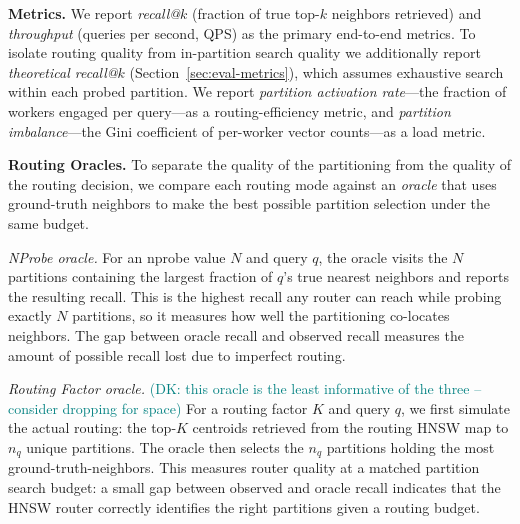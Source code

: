 \documentclass[sigconf,review,anonymous]{acmart}
\newcommand{\dk}[1]{\textcolor{teal}{(DK: #1)}}
\begin{document}
\textbf{Metrics.} We report \emph{recall@$k$} (fraction of true top-$k$ neighbors retrieved) and \emph{throughput} (queries per second, QPS) as the primary end-to-end metrics. To isolate routing quality from in-partition search quality we additionally report \emph{theoretical recall@$k$} (Section~\ref{sec:eval-metrics}), which assumes exhaustive search within each probed partition. We report \emph{partition activation rate}---the fraction of workers engaged per query---as a routing-efficiency metric, and \emph{partition imbalance}---the Gini coefficient of per-worker vector counts---as a load metric. 

\textbf{Routing Oracles.}
\label{sec:routing-oracles}
To separate the quality of the partitioning from the quality of the routing decision, we compare each routing mode against an \emph{oracle} that uses ground-truth neighbors to make the best possible partition selection under the same budget.

\textit{NProbe oracle.} For an nprobe value $N$ and query $q$, the oracle visits the $N$ partitions containing the largest fraction of $q$'s true nearest neighbors and reports the resulting recall. This is the highest recall any router can reach while probing exactly $N$ partitions, so it measures how well the partitioning co-locates neighbors. The gap between oracle recall and observed recall measures the amount of possible recall lost due to imperfect routing.

\textit{Routing Factor oracle.} \dk{this oracle is the least informative of the three -- consider dropping for space}
For a routing factor $K$ and query $q$, we first simulate the actual routing: the top-$K$ centroids retrieved from the routing HNSW map to $n_q$ unique partitions. The oracle then selects the $n_q$ partitions holding the most ground-truth-neighbors. This measures router quality at a matched partition search budget: a small gap between observed and oracle recall indicates that the HNSW router correctly identifies the right partitions given a routing budget.
\end{document}
